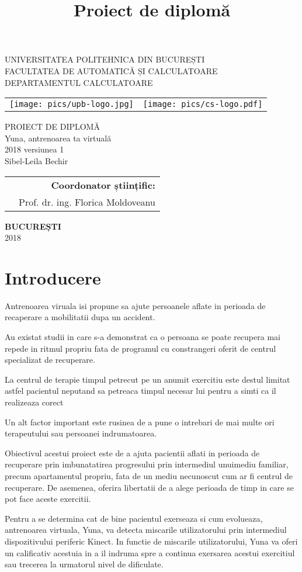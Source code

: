 \documentclass[12pt,a4paper]{report}
\title{Proiect de diplomă}
\author{\Name}
\date{\Year}
\makeatletter
\newcommand{\HeaderLineSpace}{-0.5cm}
\newcommand{\UniTextRO}{UNIVERSITATEA POLITEHNICA DIN BUCUREȘTI \\[\HeaderLineSpace] 
FACULTATEA DE AUTOMATICĂ ȘI CALCULATOARE \\[\HeaderLineSpace]
DEPARTAMENTUL CALCULATOARE\\}
\newcommand{\DiplomaRO}{PROIECT DE DIPLOMĂ}
\newcommand{\AdvisorRO}{Coordonator științific:}
\newcommand{\BucRO}{BUCUREȘTI}
\newcommand{\UniTextEN}{UNIVERSITY POLITEHNICA OF BUCHAREST \\[\HeaderLineSpace]
FACULTY OF AUTOMATIC CONTROL AND COMPUTERS \\[\HeaderLineSpace]
COMPUTER SCIENCE DEPARTMENT\\}
\newcommand{\DiplomaEN}{DIPLOMA PROJECT}
\newcommand{\AdvisorEN}{Thesis advisor:}
\newcommand{\BucEN}{BUCHAREST}
\newcommand{\frontPage}[6]{
\begin{titlepage}
\begin{center}
{\Large #1}  %
\vspace{50pt}
\begin{tabular}{p{6cm}p{4cm}}
\texttt{[image: pics/upb-logo.jpg]} &
	\texttt{[image: pics/cs-logo.pdf]}
\end{tabular}

\vspace{105pt}
{\Huge #2}\\                           %
\vspace{40pt}
{\Large #3}\\ \vspace{0pt}  %
{\Large #4}\\                          %
\vspace{40pt}
{\LARGE \Name}\\                   %
\end{center}
\vspace{60pt}
\begin{tabular*}{\textwidth}{@{\extracolsep{\fill}}p{6cm}r}
&{\large\textbf{#5}}\vspace{10pt}\\      %
&{\large \Advisor}                                    %
\end{tabular*}
\vspace{20pt}
\begin{center}
{\large\textbf{#6}}\\                                %
\vspace{0pt}
{\normalsize \Year}
\end{center}
\end{titlepage}
}
\newcommand{\frontPageRO}{\frontPage{\UniTextRO}{\DiplomaRO}{\ProjectTitleRO}{\ProjectSubtitleRO}{\AdvisorRO}{\BucRO}}
\newcommand{\frontPageEN}{\frontPage{\UniTextEN}{\DiplomaEN}{\ProjectTitleEN}{\ProjectSubtitleEN}{\AdvisorEN}{\BucEN}}
\newcommand{\ThanksPage}{
\begin{titlepage}
{\noindent \large\textbf{MULȚUMIRI}}\\
\Thanks
\end{titlepage}
}
\newcommand{\ProjectTitleRO}{Yuna, antrenoarea ta virtuală}
\newcommand{\ProjectSubtitleRO}{2018 versiunea 1}
\newcommand{\ProjectTitleEN}{Yuna, your virtual coaching}
\newcommand{\ProjectSubtitleEN}{2018 version 1}
\newcommand{\Name}{Sibel-Leila Bechir}
\newcommand{\Advisor}{Prof. dr. ing. Florica Moldoveanu}
\newcommand{\Year}{2018}
\makeatother
\begin{document}
\frontPageRO


\begingroup
\linespread{1}
\tableofcontents
\endgroup



\newpage


\chapter{Introducere}

\pagestyle{fancy}

Antrenoarea viruala isi propune sa ajute persoanele aflate in perioada de recaperare a mobilitatii dupa un accident. 

Au existat studii in care s-a demonstrat ca o persoana se poate recupera mai repede in ritmul propriu fata de programul cu constrangeri oferit de centrul specializat de recuperare. 

La centrul de terapie timpul petrecut pe un anumit exercitiu este destul limitat astfel pacientul neputand sa petreaca timpul necesar lui pentru a simti ca il realizeaza corect


Un alt factor important este rusinea de a pune o intrebari de mai multe ori terapeutului sau persoanei indrumatoarea.

Obiectivul acestui proiect este de a ajuta pacientii aflati in perioada de recuperare prin imbunatatirea progresului prin intermediul unuimediu familiar, precum apartamentul propriu, fata de un mediu necunoscut cum ar fi centrul de recuperare. De asemenea, oferira libertatii de a alege perioada de timp in care se pot face aceste exercitii.

Pentru a se determina cat de bine pacientul exerseaza si cum evolueaza, antrenoarea virtuala, Yuna, va detecta miscarile utilizatorului prin intermediul dispozitivului periferic Kinect. In functie de miscarile utilizatorului, Yuna  va oferi un calificativ acestuia in a il indruma spre a continua exersarea acestui exercitiul sau trecerea la urmatorul nivel de dificulate.


\end{document}
